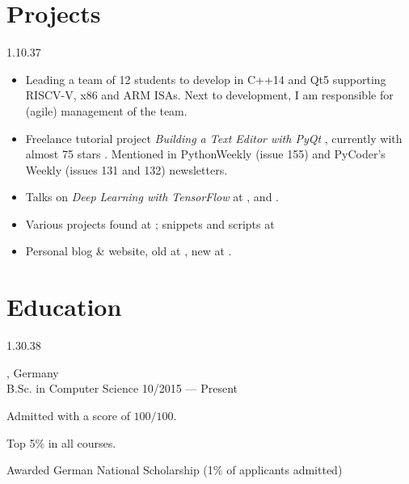 \section{Projects}{1.1}{0.37}
\vspace{-4mm}
\begin{itemize}
  \item Leading a team of 12 students to develop  in C++14 and Qt5 supporting RISCV-V, x86 and ARM ISAs. Next to development, I am responsible for (agile) management of the team.
	\item Freelance tutorial project \emph{Building a Text Editor with
      PyQt} , currently with
    almost 75 stars . Mentioned in PythonWeekly (issue 155) and PyCoder's Weekly (issues 131 and 132) newsletters.
  \item Talks on \emph{Deep Learning with TensorFlow} at ,  and .
  \item Various projects found at
	; snippets and scripts at 
	\item Personal blog \& website, old at , new at .
\end{itemize}

\vspace{-2mm}
\section{Education}{1.3}{0.38}
\begin{entry}
	{, Germany}
	{\\B.Sc. in Computer Science}
	{10/2015 --- Present}
	\item Admitted with a score of $100/100$.
  \item Top 5\% in all courses.
  \item Awarded German National Scholarship (1\% of applicants admitted)
\end{entry}

